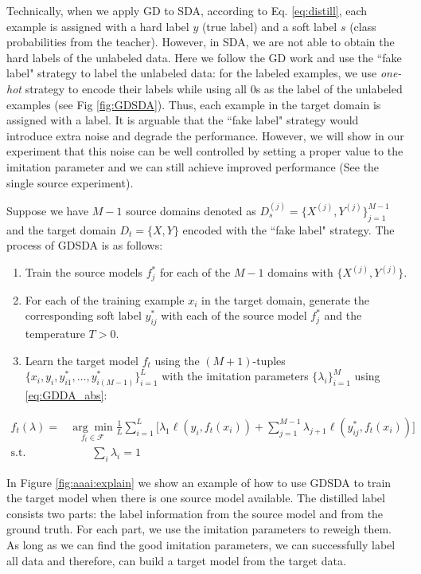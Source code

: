 Technically, when we apply GD to SDA, according to Eq. \eqref{eq:distill}, each example is assigned with a hard label $y$ (true label) and a soft label $s$ (class probabilities from the teacher). However, in SDA, we are not able to obtain the hard labels of the unlabeled data. Here we follow the GD work\cite{lopez2015unifying} and use the ``fake label" strategy to label the unlabeled data: for the labeled examples, we use \textit{one-hot} strategy to encode their labels while using all 0s as the label of the unlabeled examples (see Fig \ref{fig:GDSDA}). Thus, each example in the target domain is assigned with a label. It is arguable that the ``fake label" strategy would introduce extra noise and degrade the performance. However, we will show in our experiment that this noise can be well controlled by setting a proper value to the imitation parameter and we can still achieve improved performance (See the single source experiment).

Suppose we have $M-1$ source domains denoted as $D_s^{(j)}=\{X^{(j)},Y^{(j)}\}_{j=1}^{M-1}$ and the target domain $D_t=\{X,Y\}$ encoded with the ``fake label" strategy. The process of GDSDA is as follows:
\begin{enumerate}
	\item Train the source models $f^*_j$ for each of the $M-1$ domains with $\{X^{(j)},Y^{(j)}\}$.
	\item For each of the training example $x_i$ in the target domain, generate the corresponding soft label $y^*_{ij}$ with each of the source model $f^*_j$ and the temperature $T>0$.
	\item Learn the target model $f_t$ using the $(M+1)$-tuples $\{x_i,y_i,y^*_{i1},\dots,y^*_{i(M-1)}\}_{i=1}^L$ with the imitation parameters $\{\lambda_i\}^M_{i=1}$ using \eqref{eq:GDDA_abs}:
\end{enumerate} 
\begin{equation}\label{eq:GDDA_abs}
\begin{aligned}
f_t(\lambda)=&\underset{f_t \in \mathcal{F}}{\arg \min}\frac{1}{L}\sum_{i=1}^{L}\bigg[\lambda_1\ell\left(y_i,f_t(x_i)\right)+\sum_{j=1}^{M-1}\lambda_{j+1}\ell\left(y^*_{ij},f_t(x_i)\right)\bigg]\\
\text{s.t.} & \qquad \sum_i\lambda_i=1
\end{aligned}
\end{equation}

In Figure \ref{fig:aaai:explain} we show an example of how to use GDSDA to train the target model when there is one source model available. The distilled label consists two parts: the label information from the source model and from the ground truth. For each part, we use the imitation parameters to reweigh them. As long as we can find the good imitation parameters, we can successfully label all data and therefore, can build a target model from the target data.

